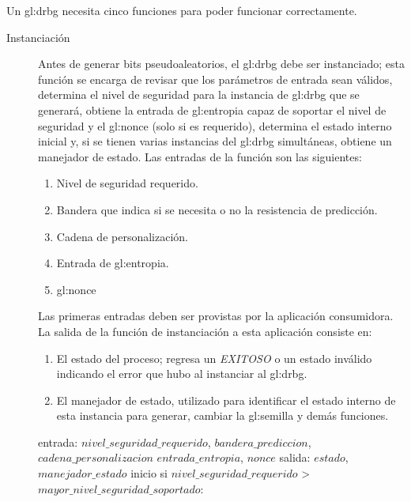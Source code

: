 %
%

Un \gls{gl:drbg} necesita cinco funciones para poder funcionar correctamente.
\begin{description}
  \item [Instanciación] Antes de generar bits pseudoaleatorios, el \gls{gl:drbg}
    debe ser instanciado; esta función se encarga de revisar que los parámetros
    de entrada sean válidos, determina  el nivel de seguridad para la instancia
    de \gls{gl:drbg} que se generará, obtiene la entrada de \gls{gl:entropia}
    capaz de soportar el nivel de seguridad y el \gls{gl:nonce} (solo si es
    requerido), determina el estado interno inicial y, si se tienen varias
    instancias del \gls{gl:drbg} simultáneas, obtiene un manejador de estado.
    Las entradas de la función son las siguientes:
    \begin{enumerate}
      \item Nivel de seguridad requerido.
      \item Bandera que indica si se necesita o no la resistencia de predicción.
      \item Cadena de personalización.
      \item Entrada de \gls{gl:entropia}. 
      \item \gls{gl:nonce}
    \end{enumerate}
    Las primeras entradas deben ser provistas por la aplicación consumidora. La
    salida de la función de instanciación a esta aplicación consiste en:
    \begin{enumerate}
      \item El estado del proceso; regresa un \textit{EXITOSO} o un estado
        inválido indicando el error que hubo al instanciar al \gls{gl:drbg}.
      \item El manejador de estado, utilizado para identificar el estado interno
        de esta instancia para generar, cambiar la \gls{gl:semilla} y demás
        funciones.
    \end{enumerate}
    \begin{pseudocodigo}[caption={DRBG, instanciación.}, label={drbg:1}]
      entrada:  $nivel\_seguridad\_requerido$, $bandera\_prediccion$, $cadena\_personalizacion$
                $entrada\_entropia$, $nonce$ 
      salida:   $estado$, $manejador\_estado$
      inicio
        si $nivel\_seguridad\_requerido$ > $mayor\_nivel\_seguridad\_soportado$:

\end{pseudocodigo}
\end{description}
